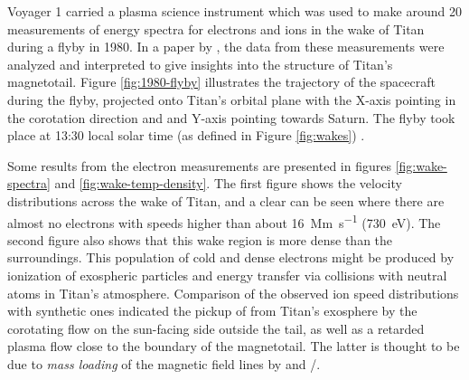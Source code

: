 \documentclass[12pt, parskip=full*, abstract]{scrartcl}
\begin{document}




Voyager 1 carried a plasma science instrument which was used to make around 20 measurements of energy spectra for electrons and ions in the wake of Titan during a flyby in 1980. In a paper by \textcite{hartle-1982}, the data from these measurements were analyzed and interpreted to give insights into the structure of Titan's magnetotail. Figure \ref{fig:1980-flyby} illustrates the trajectory of the spacecraft during the flyby, projected onto Titan's orbital plane with the X-axis pointing in the corotation direction and and Y-axis pointing towards Saturn. The flyby took place at 13:30 local solar time (as defined in Figure \ref{fig:wakes}) \parencite{ness-1982}. 

Some results from the electron measurements are presented in figures \ref{fig:wake-spectra} and \ref{fig:wake-temp-density}. The first figure shows the velocity distributions across the wake of Titan, and a clear  can be seen where there are almost no electrons with speeds higher than about \SI{16}{\mega\metre\per\second} (\SI{730}{\electronvolt}). The second figure also shows that this wake region is more dense than the surroundings. This population of cold and dense electrons might be produced by ionization of exospheric particles and energy transfer via collisions with neutral atoms in Titan's atmosphere. Comparison of the observed ion speed distributions with synthetic ones indicated the pickup of  from Titan's exosphere by the corotating flow on the sun-facing side outside the tail, as well as a retarded plasma flow close to the boundary of the magnetotail. The latter is thought to be due to \textit{mass loading} of the magnetic field lines by  and /.
\end{document}

